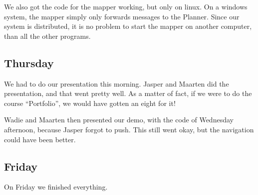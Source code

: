 \documentclass[a4paper,10pt]{article}
\begin{document}
We also got the code for the mapper working, but only on linux. On a windows
system, the mapper simply only forwards messages to the Planner. Since our
system is distributed, it is no problem to start the mapper on another computer,
than all the other programs.

\subsection*{Thursday}
We had to do our presentation this morning. Jasper and Maarten did the
presentation, and that went pretty well. As a matter of fact, if we were to do
the course ``Portfolio'', we would have gotten an eight for it!

Wadie and Maarten then presented our demo, with the code of Wednesday afternoon,
because Jasper forgot to push. This still went okay, but the navigation could have been better.

\subsection*{Friday}
On Friday we finished everything.
\end{document}
